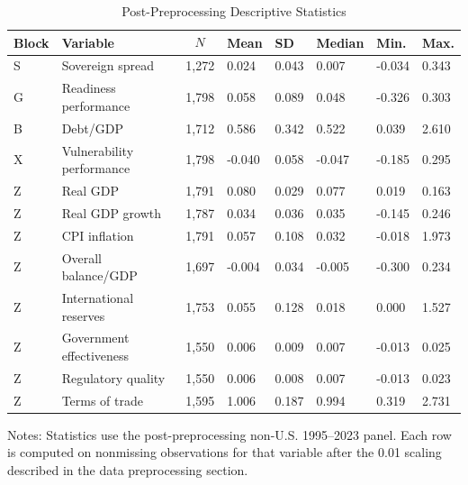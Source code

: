 \begin{table}[H]\centering
\begin{threeparttable}
\caption{Post-Preprocessing Descriptive Statistics}
\label{tab:preprocessed_descriptive_stats}
\scriptsize
\begin{tabularx}{\textwidth}{llYYYYYY}
\toprule
Block & Variable & $$N$$ & Mean & SD & Median & Min. & Max. \\
\midrule
S & Sovereign spread & 1,272 & 0.024 & 0.043 & 0.007 & -0.034 & 0.343 \\
G & Readiness performance & 1,798 & 0.058 & 0.089 & 0.048 & -0.326 & 0.303 \\
B & Debt/GDP & 1,712 & 0.586 & 0.342 & 0.522 & 0.039 & 2.610 \\
X & Vulnerability performance & 1,798 & -0.040 & 0.058 & -0.047 & -0.185 & 0.295 \\
Z & Real GDP & 1,791 & 0.080 & 0.029 & 0.077 & 0.019 & 0.163 \\
Z & Real GDP growth & 1,787 & 0.034 & 0.036 & 0.035 & -0.145 & 0.246 \\
Z & CPI inflation & 1,791 & 0.057 & 0.108 & 0.032 & -0.018 & 1.973 \\
Z & Overall balance/GDP & 1,697 & -0.004 & 0.034 & -0.005 & -0.300 & 0.234 \\
Z & International reserves & 1,753 & 0.055 & 0.128 & 0.018 & 0.000 & 1.527 \\
Z & Government effectiveness & 1,550 & 0.006 & 0.009 & 0.007 & -0.013 & 0.025 \\
Z & Regulatory quality & 1,550 & 0.006 & 0.008 & 0.007 & -0.013 & 0.023 \\
Z & Terms of trade & 1,595 & 1.006 & 0.187 & 0.994 & 0.319 & 2.731 \\
\bottomrule
\end{tabularx}
\begin{tablenotes}[flushleft]\footnotesize
\item Notes: Statistics use the post-preprocessing non-U.S. 1995--2023 panel. Each row is computed on nonmissing observations for that variable after the 0.01 scaling described in the data preprocessing section.
\end{tablenotes}
\end{threeparttable}
\end{table}
